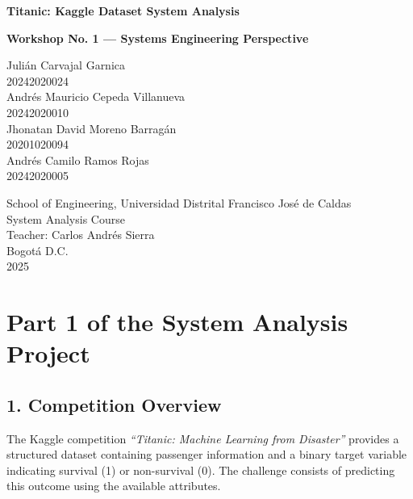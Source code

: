 \documentclass[12pt]{report}
\begin{document}
\begin{titlepage}
    \centering
    
    {\Large \textbf{Titanic: Kaggle Dataset System Analysis} \par}
    \vspace{0.5cm}
    {\large \textbf{Workshop No. 1 — Systems Engineering Perspective} \par}
    \vspace{3cm}
    
    {\large 
    Julián Carvajal Garnica \\ 
    20242020024 \\[0.5cm]
    Andrés Mauricio Cepeda Villanueva \\
    20242020010 \\[0.5cm]
    Jhonatan David Moreno Barragán \\
    20201020094 \\[0.5cm]
    Andrés Camilo Ramos Rojas \\
    20242020005
    }
    
    \vfill
    
    School of Engineering, Universidad Distrital Francisco José de Caldas \\
    System Analysis Course \\
    Teacher: Carlos Andrés Sierra \\
    Bogotá D.C. \\
    2025
    
\end{titlepage}

\chapter*{Part 1 of the System Analysis Project}

\section*{1. Competition Overview}

The Kaggle competition \textit{“Titanic: Machine Learning from Disaster”} provides a structured dataset containing passenger information and a binary target variable indicating survival (1) or non-survival (0). The challenge consists of predicting this outcome using the available attributes.
\end{document}
